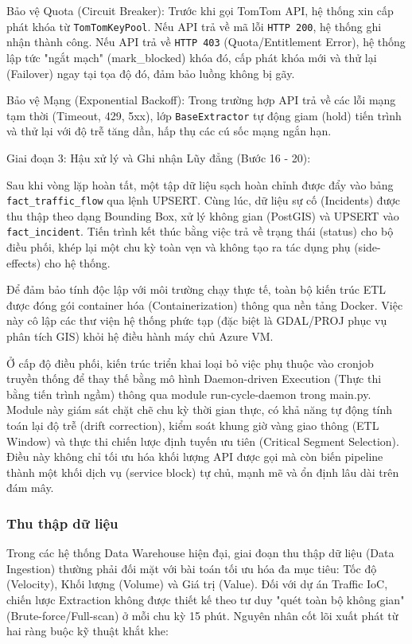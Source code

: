 Bảo vệ Quota (Circuit Breaker): Trước khi gọi TomTom API, hệ thống xin cấp phát khóa từ \texttt{TomTomKeyPool}. Nếu API trả về mã lỗi \texttt{HTTP 200}, hệ thống ghi nhận thành công. Nếu API trả về \texttt{HTTP 403} (Quota/Entitlement Error), hệ thống lập tức "ngắt mạch" (mark\_blocked) khóa đó, cấp phát khóa mới và thử lại (Failover) ngay tại tọa độ đó, đảm bảo luồng không bị gãy.


Bảo vệ Mạng (Exponential Backoff): Trong trường hợp API trả về các lỗi mạng tạm thời (Timeout, 429, 5xx), lớp \texttt{BaseExtractor} tự động giam (hold) tiến trình và thử lại với độ trễ tăng dần, hấp thụ các cú sốc mạng ngắn hạn.


Giai đoạn 3: Hậu xử lý và Ghi nhận Lũy đẳng (Bước 16 - 20):


    Sau khi vòng lặp hoàn tất, một tập dữ liệu sạch hoàn chỉnh được đẩy vào bảng \texttt{fact\_traffic\_flow} qua lệnh UPSERT. Cùng lúc, dữ liệu sự cố (Incidents) được thu thập theo dạng Bounding Box, xử lý không gian (PostGIS) và UPSERT vào \texttt{fact\_incident}. Tiến trình kết thúc bằng việc trả về trạng thái (status) cho bộ điều phối, khép lại một chu kỳ toàn vẹn và không tạo ra tác dụng phụ (side-effects) cho hệ thống.


Để đảm bảo tính độc lập với môi trường chạy thực tế, toàn bộ kiến trúc ETL được đóng gói container hóa (Containerization) thông qua nền tảng Docker. Việc này cô lập các thư viện hệ thống phức tạp (đặc biệt là GDAL/PROJ phục vụ phân tích GIS) khỏi hệ điều hành máy chủ Azure VM.


Ở cấp độ điều phối, kiến trúc triển khai loại bỏ việc phụ thuộc vào cronjob truyền thống để thay thế bằng mô hình Daemon-driven Execution (Thực thi bằng tiến trình ngầm) thông qua module run-cycle-daemon trong main.py. Module này giám sát chặt chẽ chu kỳ thời gian thực, có khả năng tự động tính toán lại độ trễ (drift correction), kiểm soát khung giờ vàng giao thông (ETL Window) và thực thi chiến lược định tuyến ưu tiên (Critical Segment Selection). Điều này không chỉ tối ưu hóa khối lượng API được gọi mà còn biến pipeline thành một khối dịch vụ (service block) tự chủ, mạnh mẽ và ổn định lâu dài trên đám mây.


\subsubsection{Thu thập dữ liệu}
Trong các hệ thống Data Warehouse hiện đại, giai đoạn thu thập dữ liệu (Data Ingestion) thường phải đối mặt với bài toán tối ưu hóa đa mục tiêu: Tốc độ (Velocity), Khối lượng (Volume) và Giá trị (Value). Đối với dự án Traffic IoC, chiến lược Extraction không được thiết kế theo tư duy "quét toàn bộ không gian" (Brute-force/Full-scan) ở mỗi chu kỳ 15 phút. Nguyên nhân cốt lõi xuất phát từ hai ràng buộc kỹ thuật khắt khe:


